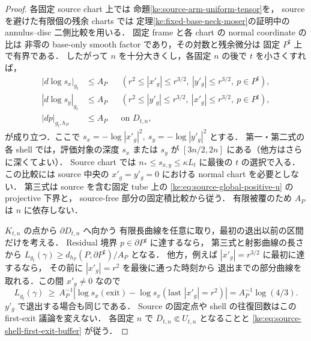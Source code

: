 \begin{proof}
各固定 source chart 上では
命題\ref{ke:source-arm-uniform-tensor}を，
source を避けた有限個の残余 charts では
定理\ref{ke:fixed-base-neck-moser}の証明中の
annulus--disc 二側比較を用いる．
固定 frame と各 chart の normal coordinate の比は
非零の base-only smooth factor であり，その対数と残余微分は
固定 \(P^\sharp\) 上で有界である．
したがって \(n\) を十分大きくし，各固定 \(n\) の後で
\(t\) を小さくすれば，
\[
 \begin{aligned}
 |d\log s_x|_{g_t}&\le A_P
 &&(r^2\le |x'_g|\le r^{3/2},\
          |y'_g|\le r^{3/2},\ p\in P^\sharp),\\
 |d\log s_y|_{g_t}&\le A_P
 &&(r^2\le |y'_g|\le r^{3/2},\
          |x'_g|\le r^{3/2},\ p\in P^\sharp),\\
 |dp|_{g_t,h_P}&\le A_P &&\text{on }D_{t,n},
 \end{aligned}
\]
が成り立つ．ここで
\(s_x=-\log|x'_g|^2,\ s_y=-\log|y'_g|^2\) とする．
第一・第二式の各 shell では，評価対象の深度 \(s_x\) または
\(s_y\) が \([3n/2,2n]\) にある（他方はさらに深くてよい）．
Source chart では
\(n_*\le s_{x,y}\le\kappa L_t\) に最後の \(t\) の選択で入る．
この比較には source 中央の \(x'_g=y'_g=0\) における
normal chart を必要としない．
第三式は source を含む固定 tube 上の
\eqref{ke:eq:source-global-positive-u} の projective 下界と，
source-free 部分の固定積比較から従う．
有限被覆のため \(A_P\) は \(n\) に依存しない．

\(K_{t,n}\) の点から \(\partial D_{t,n}\) へ向かう
有限長曲線を任意に取り，最初の退出以前の区間だけを考える．
Residual 境界 \(p\in\partial P^\sharp\) に達するなら，
第三式と射影曲線の長さから
\(L_{g_t}(\gamma)\ge d_{h_P}(P,\partial P^\sharp)/A_P\)
となる．
他方，例えば \(|x'_g|=r^{3/2}\) に最初に達するなら，
その前に \(|x'_g|=r^2\) を最後に通った時刻から
退出までの部分曲線を取れる．この間 \(x'_g\ne0\) なので
\[
  L_{g_t}(\gamma)\ \ge\
  A_P^{-1}\left|
   \log s_x(\text{exit})-\log s_x(\text{last }|x'_g|=r^2)
  \right|
  =A_P^{-1}\log(4/3).
\]
\(y'_g\) で退出する場合も同じである．
Source の固定点や shell の往復回数はこの first-exit 議論を変えない．
各固定 \(n\) で \(\overline D_{t,n}\Subset U_{t,n}\) となることと
\eqref{ke:eq:source-shell-first-exit-buffer} が従う．
\end{proof}

